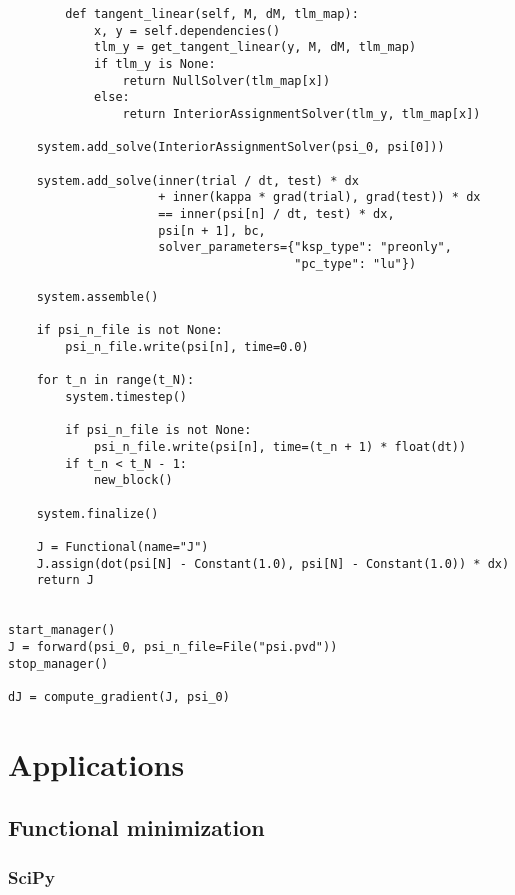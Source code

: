 \documentclass[11pt]{article}
\begin{document}
\begin{lstlisting}
        def tangent_linear(self, M, dM, tlm_map):
            x, y = self.dependencies()
            tlm_y = get_tangent_linear(y, M, dM, tlm_map)
            if tlm_y is None:
                return NullSolver(tlm_map[x])
            else:
                return InteriorAssignmentSolver(tlm_y, tlm_map[x])

    system.add_solve(InteriorAssignmentSolver(psi_0, psi[0]))

    system.add_solve(inner(trial / dt, test) * dx
                     + inner(kappa * grad(trial), grad(test)) * dx
                     == inner(psi[n] / dt, test) * dx,
                     psi[n + 1], bc,
                     solver_parameters={"ksp_type": "preonly",
                                        "pc_type": "lu"})

    system.assemble()

    if psi_n_file is not None:
        psi_n_file.write(psi[n], time=0.0)

    for t_n in range(t_N):
        system.timestep()

        if psi_n_file is not None:
            psi_n_file.write(psi[n], time=(t_n + 1) * float(dt))
        if t_n < t_N - 1:
            new_block()

    system.finalize()

    J = Functional(name="J")
    J.assign(dot(psi[N] - Constant(1.0), psi[N] - Constant(1.0)) * dx)
    return J


start_manager()
J = forward(psi_0, psi_n_file=File("psi.pvd"))
stop_manager()

dJ = compute_gradient(J, psi_0)
\end{lstlisting}

\section{Applications}

\subsection{Functional minimization}\label{sect:minimization}

\subsubsection{SciPy}
\end{document}
